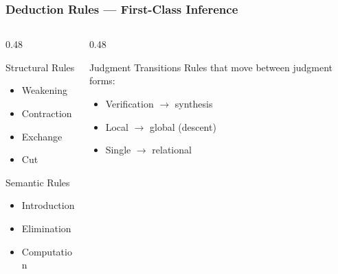 \begin{frame}
\frametitle{Deduction Rules --- First-Class Inference}
\begin{columns}[T]
\begin{column}{0.48\textwidth}
\begin{alertblock}{Structural Rules}
  \begin{itemize}
    \item Weakening
    \item Contraction
    \item Exchange
    \item Cut
  \end{itemize}
\end{alertblock}
\vspace{4pt}
\begin{exampleblock}{Semantic Rules}
  \begin{itemize}
    \item Introduction
    \item Elimination
    \item Computation
  \end{itemize}
\end{exampleblock}
\end{column}
\begin{column}{0.48\textwidth}
\begin{block}{Judgment Transitions}
  Rules that move between judgment forms:
  \begin{itemize}
    \item Verification $\to$ synthesis
    \item Local $\to$ global (descent)
    \item Single $\to$ relational
  \end{itemize}
\end{block}
\vspace{4pt}
\begin{center}
\end{center}
\end{column}
\end{columns}
\end{frame}
